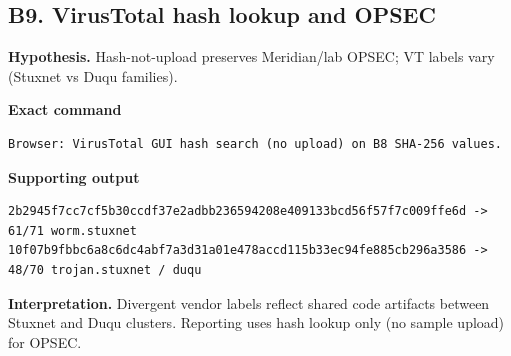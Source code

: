 \documentclass[11pt,letterpaper]{article}
\begin{document}
\subsection*{B9. VirusTotal hash lookup and OPSEC}
\textbf{Hypothesis.} Hash-not-upload preserves Meridian/lab OPSEC; VT labels vary (Stuxnet vs Duqu families).
\par\medskip\noindent\textbf{Exact command}
\begin{lstlisting}
Browser: VirusTotal GUI hash search (no upload) on B8 SHA-256 values.
\end{lstlisting}
\noindent\textbf{Supporting output}
\begin{lstlisting}
2b2945f7cc7cf5b30ccdf37e2adbb236594208e409133bcd56f57f7c009ffe6d -> 61/71 worm.stuxnet
10f07b9fbbc6a8c6dc4abf7a3d31a01e478accd115b33ec94fe885cb296a3586 -> 48/70 trojan.stuxnet / duqu
\end{lstlisting}
\noindent\textbf{Interpretation.} Divergent vendor labels reflect shared code artifacts between Stuxnet and Duqu clusters. Reporting uses hash lookup only (no sample upload) for OPSEC.
\vspace{0.55em}
\end{document}
